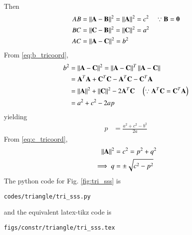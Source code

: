 \begin{enumerate}[label=\thesubsection.\arabic*.,ref=\thesubsection.\theenumi]
Then
\begin{align}
\label{eq:c_tricoord}
AB &= \left\lVert\mathbf{A}-\mathbf{B}\right\rVert^2 = \left\lVert\mathbf{A}\right\rVert^2  = c^2 \quad \because \mathbf{B} = \mathbf{0}
\\
\label{eq:a_tricoord}
BC &= \left\lVert\mathbf{C}-\mathbf{B}\right\rVert^2 = \left\lVert\mathbf{C}\right\rVert^2  = a^2
\\
AC &= \left\lVert\mathbf{A}-\mathbf{C}\right\rVert^2 =    b^2
\label{eq:b_tricoord}
\end{align}
%
From \eqref{eq:b_tricoord},
\begin{align}
b^2 &=\left\lVert\mathbf{A}-\mathbf{C}\right\rVert^2 = \left\lVert\mathbf{A}-\mathbf{C}\right\rVert^T\left\lVert\mathbf{A}-\mathbf{C}\right\rVert  
\\
&= \mathbf{A}^T\mathbf{A}+\mathbf{C}^T\mathbf{C}-\mathbf{A}^T\mathbf{C} - \mathbf{C}^T\mathbf{A} 
\\
&= \left\lVert\mathbf{A}\right\rVert^2 + \left\lVert\mathbf{C}\right\rVert^2 - 2\mathbf{A}^T\mathbf{C} \quad \left(\because \mathbf{A}^T\mathbf{C} = \mathbf{C}^T\mathbf{A} \right) 
\label{eq:tri_const_norm_ac}
\\
&= a^2+c^2-2ap
\end{align}
%
yielding
\begin{align}
p&= \frac{a^2+c^2-b^2}{2a}
\end{align}
%
From \eqref{eq:c_tricoord}, 
\begin{align}
\left\lVert\mathbf{A}\right\rVert^2 &= c^2 = p^2+q^2
\\
\implies q&= \pm \sqrt{c^2-p^2}
\end{align}
%
The python code for  Fig. \ref{fig:tri_sss} is
\begin{lstlisting}
codes/triangle/tri_sss.py
\end{lstlisting}
%
and the equivalent latex-tikz code is
%
\begin{lstlisting}
figs/constr/triangle/tri_sss.tex
\end{lstlisting}

\end{enumerate}

